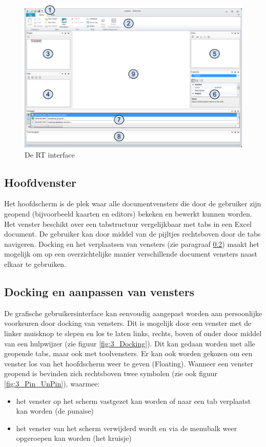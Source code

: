 \begin{figure}[H]
	\centering
		\includegraphics[width=\textwidth]{figures/chapter_general/rt_Welcome.png}
		\caption{De RT interface}
	\label{fig:RT_Welcome_Page}
\end{figure}

\subsection{Hoofdvenster}
Het hoofdscherm is de plek waar alle documentvensters die door de gebruiker zijn geopend (bijvoorbeeld kaarten en editors) bekeken en bewerkt kunnen worden. Het venster beschikt over een tabstructuur vergelijkbaar met tabs in een Excel document. De gebruiker kan door middel van de pijltjes rechtsboven door de tabs navigeren. Docking en het verplaatsen van vensters (zie paragraaf \ref{sec:RT_Docking}) maakt het mogelijk om op een overzichtelijke manier verschillende document vensters naast elkaar te gebruiken.

\subsection{Docking en aanpassen van vensters}
\label{sec:RT_Docking}
De grafische gebruikersinterface kan eenvoudig aangepast worden aan persoonlijke voorkeuren door docking van vensters. Dit is mogelijk door een venster met de linker muisknop te slepen en los te laten links, rechts, boven of onder door middel van een hulpwijzer (zie figuur \ref{fig:3_Docking}). Dit kan gedaan worden met alle geopende tabs, maar ook met toolvensters. Er kan ook worden gekozen om een venster los van het hoofdscherm weer te geven (Floating). Wanneer een venster geopend is bevinden zich rechtsboven twee symbolen (zie ook figuur \ref{fig:3_Pin_UnPin}), waarmee:
\begin{itemize}
\item het venster op het scherm vastgezet kan worden of naar een tab verplaatst kan worden (de punaise)
\item het venster van het scherm verwijderd wordt en via de menubalk weer opgeroepen kan worden (het kruisje)
\end{itemize}

